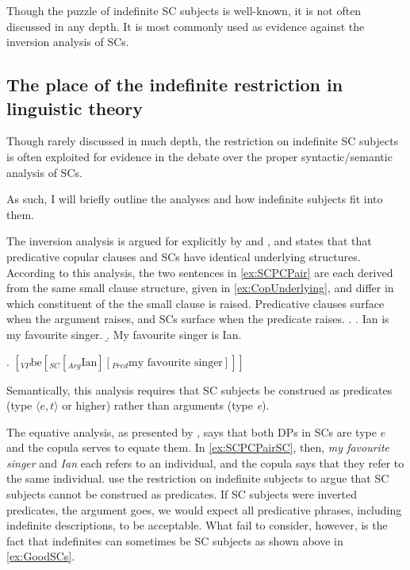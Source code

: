 \documentclass[GPFinal]{subfiles}
\begin{document}
Though the puzzle of indefinite SC subjects is well-known, it is not often discussed in any depth.
It is most commonly used as evidence against the inversion analysis of SCs.
\subsection{The place of the indefinite restriction in linguistic theory}
Though rarely discussed in much depth, the restriction on indefinite SC subjects is often exploited for evidence in the debate over the proper syntactic/semantic analysis of SCs.

As such, I will briefly outline the analyses and how indefinite subjects fit into them.

The inversion analysis is argued for explicitly by \textcite{mikkelsen2004specifying} and \textcite{moro1997raising}, and states that that predicative copular clauses and SCs have identical underlying structures.
According to this analysis, the two sentences in \ref{ex:SCPCPair} are each derived from the same small clause structure, given in \ref{ex:CopUnderlying}, and differ in which constituent of the the small clause is raised.
Predicative clauses surface when the argument raises, and SCs surface when the predicate raises.
\ex.\label{ex:SCPCPair}
\a.\label{ex:SCPCPairPC} Ian is my favourite singer.
\b.\label{ex:SCPCPairSC} My favourite singer is Ian.

\ex.\label{ex:CopUnderlying} $[_{VP} \text{be} [_{SC} [_{Arg} \text{Ian}] [_{Pred} \text{my favourite singer}]]]$

Semantically, this analysis requires that SC subjects be construed as predicates (type $\langle e,t\rangle$ or higher) rather than arguments (type \textit{e}).

The equative analysis, as presented by \textcite{heycockkroch1999pseudocleft}, says that both DPs in SCs are type $e$ and the copula serves to equate them.
In \ref{ex:SCPCPairSC}, then, \textit{my favourite singer} and \textit{Ian} each refers to an individual, and the copula says that they refer to the same individual.
\textcite{heycockkroch1999pseudocleft} use the restriction on indefinite subjects to argue that SC subjects cannot be construed as predicates.
If SC subjects were inverted predicates, the argument goes, we would expect all predicative phrases, including indefinite descriptions, to be acceptable.
What \textcite{heycockkroch1999pseudocleft} fail to consider, however, is the fact that indefinites can sometimes be SC subjects as shown above in \ref{ex:GoodSCs}.
\end{document}
